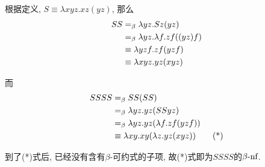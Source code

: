 \begin{solution}
    根据定义, $S\equiv \lambda xyz.xz(yz)$, 那么
    \begin{align*}
        SS&=_{\beta} \lambda yz.Sz(yz)\\
        &=_{\beta} \lambda yz.\lambda f.zf((yz)f)\\
        &\equiv \lambda yzf.zf(yzf)\\
        &\equiv \lambda xyz.yz(xyz)
    \end{align*}

    而
    \begin{align*}
        SSSS &=_{\beta} SS(SS)\\
        &=_{\beta} \lambda yz.yz(SSyz)\\
        &=_{\beta} \lambda yz.yz(\lambda f.zf(yzf))\\
        &\equiv \lambda xy.xy(\lambda z.yz(xyz))\tag{*}
    \end{align*}

    到了(*)式后, 已经没有含有$\beta$-可约式的子项, 故(*)式即为$SSSS$的$\beta\textrm{-nf}$.
\end{solution}